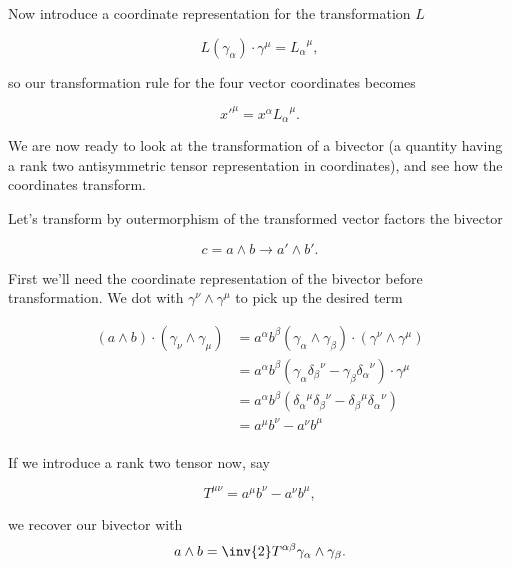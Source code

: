 Now introduce a coordinate representation for the transformation $L$ 

\begin{equation}\label{eqn:antisymmetricTensorTx:50}
L( \gamma_\alpha) \cdot \gamma^\mu  = {L_\alpha}^\mu,
\end{equation}

so our transformation rule for the four vector coordinates becomes

\begin{equation}\label{eqn:antisymmetricTensorTx:55}
{x'}^\mu = x^\alpha {L_\alpha}^\mu.
\end{equation}

We are now ready to look at the transformation of a bivector (a quantity having a rank two antisymmetric tensor representation in coordinates), and see how the coordinates transform.

Let's transform by outermorphism of the transformed vector factors the bivector 

\begin{equation}\label{eqn:antisymmetricTensorTx:60}
c = a \wedge b \rightarrow a' \wedge b'.
\end{equation}

First we'll need the coordinate representation of the bivector before transformation.  We dot with $\gamma^\nu \wedge \gamma^\mu$ to pick up the desired term

\begin{align*}
(a \wedge b) \cdot (\gamma_\nu \wedge \gamma_\mu)
&=
a^\alpha b^\beta (\gamma_\alpha \wedge \gamma_\beta) \cdot (\gamma^\nu \wedge \gamma^\mu) \\
&=
a^\alpha b^\beta ( \gamma_\alpha {\delta_\beta}^\nu -\gamma_\beta {\delta_\alpha}^\nu ) \cdot \gamma^\mu \\
&=
a^\alpha b^\beta ( {\delta_\alpha}^\mu {\delta_\beta}^\nu -{\delta_\beta}^\mu {\delta_\alpha}^\nu ) \\
&=
a^\mu b^\nu 
-a^\nu b^\mu \\
\end{align*}

If we introduce a rank two tensor now, say

\begin{equation}\label{eqn:antisymmetricTensorTx:70}
T^{\mu\nu} = a^\mu b^\nu -a^\nu b^\mu,
\end{equation}

we recover our bivector with
\begin{equation}\label{eqn:antisymmetricTensorTx:80}
a \wedge b = \inv{2} T^{\alpha \beta} \gamma_\alpha \wedge \gamma_\beta.
\end{equation}

